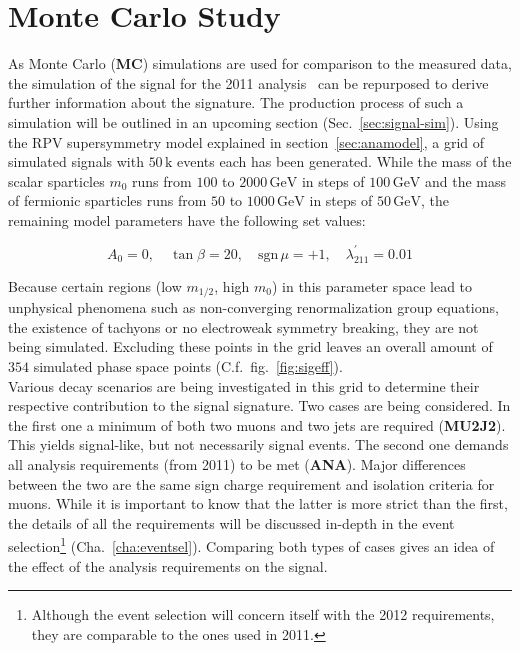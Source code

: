 \section{Monte Carlo Study}
\label{sec:mcstudy}

As Monte Carlo (\textbf{MC}) simulations are used for comparison to the measured data, the simulation of the signal for the 2011 analysis~\cite{endres} can be repurposed to derive further information about the signature. The production process of such a simulation will be outlined in an upcoming section (Sec.~\ref{sec:signal-sim}). Using the RPV supersymmetry model explained in section~\ref{sec:anamodel}, a grid of simulated signals with $50\,\text{k}$ events each has been generated. While the mass of the scalar sparticles $m_0$ runs from $100$ to $2000\,\text{GeV}$ in steps of $100\,\text{GeV}$ and the mass of fermionic sparticles runs from $50$ to $1000\,\text{GeV}$ in steps of $50\,\text{GeV}$, the remaining model parameters have the following set values:

\begin{equation*}
  A_0 = 0, \quad \tan{\beta} = 20, \quad \text{sgn}\,\mu = +1, \quad \lambda^\prime_{211} = 0.01
\end{equation*}

Because certain regions (low $m_{1/2}$, high $m_0$) in this parameter space lead to unphysical phenomena such as non-converging renormalization group equations, the existence of tachyons or no electroweak symmetry breaking, they are not being simulated. Excluding these points in the grid leaves an overall amount of $354$ simulated phase space points (C.f.~fig.~\ref{fig:sigeff}). \\

Various decay scenarios are being investigated in this grid to determine their respective contribution to the signal signature. Two cases are being considered. In the first one a minimum of both two muons and two jets are required (\textbf{MU2J2}). This yields signal-like, but not necessarily signal events. The second one demands all analysis requirements (from 2011) to be met (\textbf{ANA}). Major differences between the two are the same sign charge requirement and isolation criteria for muons. While it is important to know that the latter is more strict than the first, the details of all the requirements will be discussed in-depth in the event selection\footnote{Although the event selection will concern itself with the 2012 requirements, they are comparable to the ones used in 2011.} (Cha.~\ref{cha:eventsel}). Comparing both types of cases gives an idea of the effect of the analysis requirements on the signal.

